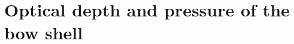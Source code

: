 \documentclass[useAMS, usenatbib, a4paper]{mnras}
\begin{document}





\section{Optical depth and pressure of the bow shell}
\label{sec:energy-trapp-vers}
\end{document}
